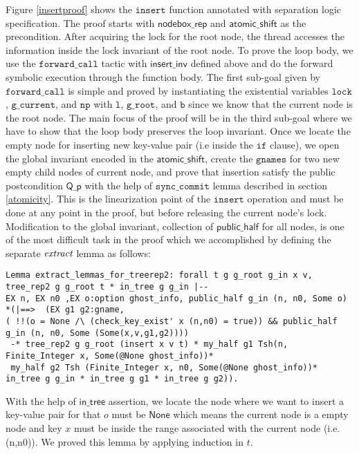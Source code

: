 \documentclass[acmsmall,screen]{acmart}\settopmatter{printfolios=true}
\begin{document}
Figure \ref{insertproof} shows the $\texttt{insert}$ function annotated with separation logic specification. The proof starts with $\mathsf{nodebox\_rep}$ and $\mathsf{atomic\_shift}$ as the precondition. After acquiring the lock for the root node, the thread accesses the information inside the lock invariant of the root node. To prove the loop body, we use the $\texttt{forward\_call}$ tactic with $\mathsf{insert\_inv}$ defined above and do the forward symbolic execution through the function body. The first sub-goal given by  $\texttt{forward\_call}$ is simple and proved by instantiating the existential variables $\texttt{lock}$, $\texttt{g\_current}$, and $\texttt{np}$ with $\texttt{l}$, $\texttt{g\_root}$, and $\texttt{b}$ since we know that the current node is the root node. The main focus of the proof will be in the third sub-goal where we have to show that the loop body preserves the loop invariant. Once we locate the empty node for inserting new key-value pair (i.e inside the $\texttt{if}$ clause), we open the global invariant encoded in the $\mathsf{atomic\_shift}$, create the $\texttt{gnames}$ for two new empty child nodes of current node, and prove that insertion satisfy the public postcondition $\mathsf{Q\_p}$ with the help of $\texttt{sync\_commit}$ lemma described in section \ref{atomicity}. This is the linearization point of the $\texttt{insert}$ operation and must be done at any point in the proof, but before releasing the current node's lock. Modification to the global invariant, collection of $\mathsf{public\_half}$ for all nodes, is one of the most difficult task in the proof which we accomplished by defining the separate $\emph{extract}$ lemma as follows:
\begin{verbatim}
Lemma extract_lemmas_for_treerep2: forall t g g_root g_in x v, tree_rep2 g g_root t * in_tree g g_in |-- 
EX n, EX n0 ,EX o:option ghost_info, public_half g_in (n, n0, Some o) *(|==>  (EX g1 g2:gname,
( !!(o = None /\ (check_key_exist' x (n,n0) = true)) && public_half g_in (n, n0, Some (Some(x,v,g1,g2))))
 -* tree_rep2 g g_root (insert x v t) * my_half g1 Tsh(n, Finite_Integer x, Some(@None ghost_info))*
 my_half g2 Tsh (Finite_Integer x, n0, Some(@None ghost_info))* in_tree g g_in * in_tree g g1 * in_tree g g2)).
  \end{verbatim}
With the help of $\mathsf{in\_tree}$ assertion, we locate the node where we want to insert a key-value pair for that $o$ must be $\mathsf{None}$ which means the current node is a empty node and key $x$ must be inside the range associated with the current node (i.e. (n,n0)). We proved this lemma by applying induction in $t$.
\end{document}
